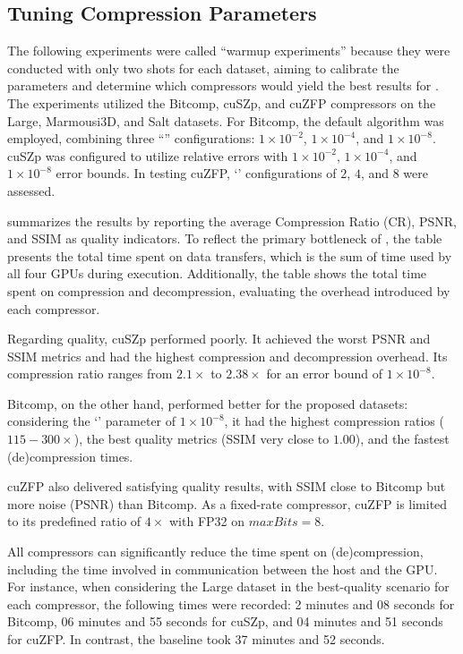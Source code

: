 \documentclass[Ingles]{ic-tese-v3}
\begin{document}
\subsection{Tuning Compression Parameters}
\label{sec:warmup}

The following experiments were called ``warmup experiments'' because they were conducted with only two shots for each dataset, aiming to calibrate the parameters and determine which compressors would yield the best results for \awave. The experiments utilized the Bitcomp, cuSZp, and cuZFP compressors on the Large, Marmousi3D, and Salt datasets. For Bitcomp, the default algorithm was employed, combining three ``'' configurations: \( 1 \times 10^{-2} \), \( 1 \times 10^{-4} \), and \( 1 \times 10^{-8} \). cuSZp was configured to utilize relative errors with \( 1 \times 10^{-2} \), \( 1 \times 10^{-4} \), and \( 1 \times 10^{-8} \) error bounds. In testing cuZFP, `' configurations of $2$, $4$, and $8$ were assessed.

 summarizes the results by reporting the average Compression Ratio (CR), PSNR, and SSIM as quality indicators. To reflect the primary bottleneck of \awave, the table presents the total time spent on data transfers, which is the sum of time used by all four GPUs during execution. Additionally, the table shows the total time spent on compression and decompression, evaluating the overhead introduced by each compressor.

Regarding quality, cuSZp performed poorly. It achieved the worst PSNR and SSIM metrics and had the highest compression and decompression overhead. Its compression ratio ranges from $2.1\times$ to $2.38\times$ for an error bound of \( 1 \times 10^{-8} \).

Bitcomp, on the other hand, performed better for the proposed datasets: considering the `' parameter of \( 1 \times 10^{-8} \), it had the highest compression ratios ($115 - 300\times$), the best quality metrics (SSIM very close to $1.00$), and the fastest (de)compression times. 

cuZFP also delivered satisfying quality results, with SSIM close to Bitcomp but more noise (PSNR) than Bitcomp. As a fixed-rate compressor, cuZFP is limited to its predefined ratio of $4\times$ with FP32 on $maxBits=8$.

All compressors can significantly reduce the time spent on (de)compression, including the time involved in communication between the host and the GPU. For instance, when considering the Large dataset in the best-quality scenario for each compressor, the following times were recorded: 2 minutes and 08 seconds for Bitcomp, 06 minutes and 55 seconds for cuSZp, and 04 minutes and 51 seconds for cuZFP. In contrast, the baseline took 37 minutes and 52 seconds. 
\end{document}
